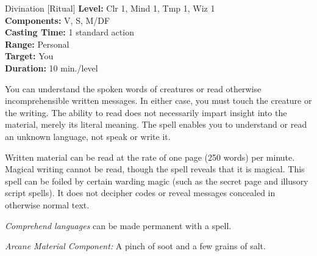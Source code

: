 {Divination [Ritual]}
{
	\textbf{Level:}
	Clr 1, Mind 1, Tmp 1, Wiz 1\\
	\textbf{Components:}
	V, S, M/DF\\
	\textbf{Casting Time:}
	1 standard action\\
	\textbf{Range:}
	Personal\\
	\textbf{Target:}
	You\\
	\textbf{Duration:}
	10 min./level\\
}
{
	You can understand the spoken words of creatures or read otherwise incomprehensible written messages. In either case, you must touch the creature or the writing. The ability to read does not necessarily impart insight into the material, merely its literal meaning. The spell enables you to understand or read an unknown language, not speak or write it.

	Written material can be read at the rate of one page (250 words) per minute. Magical writing cannot be read, though the spell reveals that it is magical. This spell can be foiled by certain warding magic (such as the secret page and illusory script spells). It does not decipher codes or reveal messages concealed in otherwise normal text.

	\emph{Comprehend languages} can be made permanent with a  spell.

	\textit{Arcane Material Component:}
	A pinch of soot and a few grains of salt.

}
